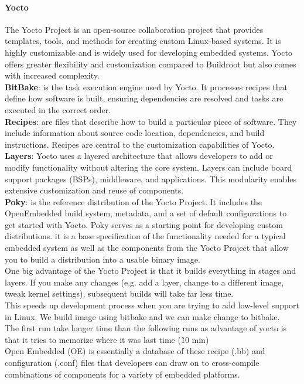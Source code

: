 \paragraph{\textbf{Yocto\\}}
The Yocto Project is an open-source collaboration project that provides templates, tools, and methods for creating custom Linux-based systems. It is highly customizable and is widely used for developing embedded systems. Yocto offers greater flexibility and customization compared to Buildroot but also comes with increased complexity.
\noindent \\
\textbf{BitBake}:  is the task execution engine used by Yocto. It processes recipes that define how software is built, ensuring dependencies are resolved and tasks are executed in the correct order.\\
\textbf{Recipes}: are files that describe how to build a particular piece of software. They include information about source code location, dependencies, and build instructions. Recipes are central to the customization capabilities of Yocto.\\
\textbf{Layers}: Yocto uses a layered architecture that allows developers to add or modify functionality without altering the core system. Layers can include board support packages (BSPs), middleware, and applications. This modularity enables extensive customization and reuse of components. \\
\textbf{Poky}: is the reference distribution of the Yocto Project. It includes the OpenEmbedded build system, metadata, and a set of default configurations to get started with Yocto. Poky serves as a starting point for developing custom distributions. it is a base specification of the functionality needed for a typical embedded system as well as the components from the Yocto Project that allow you to build a distribution into a usable binary image. \\

One big advantage of the Yocto Project is that it builds everything in stages and layers. If you make any changes (e.g. add a layer, change to a different image, tweak kernel settings), subsequent builds will take far less time. \\
This speeds up development process when you are trying to add low-level support in Linux. We build image using bitbake and we can make change to bitbake.\\
The first run take longer time than the following runs as advantage of yocto is that it tries to memorize where it was last time (\~ 10 min)\\
Open Embedded (OE) is essentially a database of these recipe (.bb) and configuration (.conf) files that developers can draw on to cross-compile combinations of components for a variety of embedded platforms.\\



